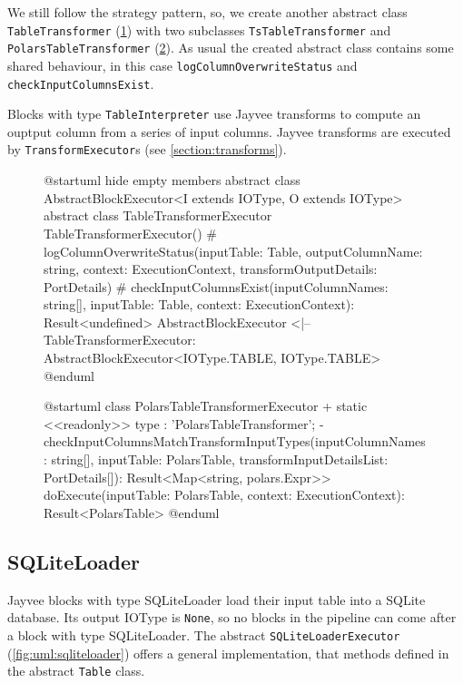 We still follow the strategy pattern, so, we create another abstract class \Verb|TableTransformer| (\ref{fig:uml:tabletransformer}) with two subclasses \Verb|TsTableTransformer| and \Verb|PolarsTableTransformer| (\ref{fig:uml:polarstabletransformer}).
As usual the created abstract class contains some shared behaviour, in this case \Verb|logColumnOverwriteStatus| and \Verb|checkInputColumnsExist|.

Blocks with type \Verb|TableInterpreter| use Jayvee transforms to compute an ouptput column from a series of input columns.
Jayvee transforms are executed by \Verb|TransformExecutor|s (see \ref{section:transforms}).

\begin{figure}
	\begin{plantuml}
		@startuml
		hide empty members
		abstract class AbstractBlockExecutor<I extends IOType, O extends IOType>
		abstract class TableTransformerExecutor {
				TableTransformerExecutor()
				# logColumnOverwriteStatus(inputTable: Table, outputColumnName: string, context: ExecutionContext, transformOutputDetails: PortDetails)
				# checkInputColumnsExist(inputColumnNames: string[], inputTable: Table, context: ExecutionContext): Result<undefined>
			}
		AbstractBlockExecutor <|-- TableTransformerExecutor: AbstractBlockExecutor<IOType.TABLE, IOType.TABLE>
		@enduml
	\end{plantuml}
	\caption{}
	\label{fig:uml:tabletransformer}
\end{figure}
\begin{figure}
	\begin{plantuml}
		@startuml
		class PolarsTableTransformerExecutor  {
		+ {static} <<readonly>> type : 'PolarsTableTransformer';
		- checkInputColumnsMatchTransformInputTypes(inputColumnNames: string[], inputTable: PolarsTable, transformInputDetailsList: PortDetails[]): Result<Map<string, polars.Expr>>
		doExecute(inputTable: PolarsTable, context: ExecutionContext): Result<PolarsTable>
		}
		@enduml
	\end{plantuml}
	\caption{}
	\label{fig:uml:polarstabletransformer}
\end{figure}

\subsection{SQLiteLoader}
Jayvee blocks with type SQLiteLoader load their input table into a SQLite database.
Its output IOType is \Verb|None|, so no blocks in the pipeline can come after a block with type SQLiteLoader.
The abstract \Verb|SQLiteLoaderExecutor| (\ref{fig:uml:sqliteloader}) offers a general implementation, that methods defined in the abstract \Verb|Table| class.

